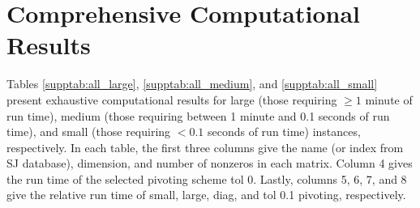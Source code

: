 \documentclass[10pt]{article}
\begin{document}
\appendix

\section{Comprehensive Computational Results} \label{s:ResultsALL}

Tables \ref{supptab:all_large}, \ref{supptab:all_medium}, and \ref{supptab:all_small} present exhaustive computational results for large (those requiring $\geq1$ minute of run time), medium (those requiring between 1 minute and 0.1 seconds of run time), and small (those requiring $< 0.1$ seconds of run time) instances, respectively. In each table, the first three columns give the name (or index from SJ database), dimension, and number of nonzeros in each matrix. Column 4 gives the run time of the selected pivoting scheme tol 0. Lastly, columns 5, 6, 7, and 8 give the relative run time of small, large, diag, and tol 0.1 pivoting, respectively. \newpage
\end{document}
